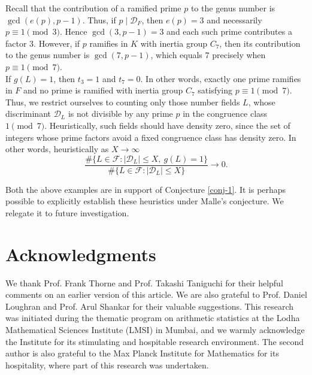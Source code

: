 \documentclass[11pt,reqno]{amsart}
\newcommand{\cD}{\mathcal{D}}
\theoremstyle{definition}
\theoremstyle{remark}
\begin{document}
Recall that the contribution of a ramified prime $p$ to the genus number is $\gcd(e(p),p-1)$. Thus, if $p\mid \mathcal{D}_F$, then $e(p)=3$ and necessarily $p\equiv 1\pmod{3}$. Hence $\gcd(3,p-1)=3$ and each such prime contributes a factor $3$. However, if $p$ ramifies in $K$ with inertia group $C_7$, then its contribution to the genus number is $\gcd(7,p-1)$, which equals $7$ precisely when $p\equiv1\pmod7$.\\

If $g(L)=1$, then  $t_3=1$ and  $t_7=0$. In other words, exactly one prime ramifies in $F$ and no prime is ramified with inertia group $C_7$ satisfying $p\equiv 1 \pmod 7$. Thus, we restrict ourselves to counting only those number fields $L$, whose discriminant $\cD_L$ is not divisible by any prime $p$ in the congruence class $1\pmod 7$. Heuristically, such fields should have density zero, since the set of integers whose prime factors avoid a fixed congruence class has density zero. In other words, heuristically as $X\to\infty$
$$
    \frac{\#\{L\in\mathcal{F}:|\mathcal{D}_L|\le X,\ g(L)=1\}}
{\#\{L\in\mathcal{F}:|\mathcal{D}_L|\le X\}}
\longrightarrow 0.
$$

Both the above examples are in support of Conjecture \ref{conj-1}. It is perhaps possible to explicitly establish these heuristics under Malle's conjecture. We relegate it to future investigation.

 \section*{\bf Acknowledgments}
\medskip

We thank Prof. Frank Thorne and Prof. Takashi Taniguchi for their helpful comments on an earlier version of this article. We are also grateful to Prof. Daniel Loughran and Prof. Arul Shankar for their valuable suggestions. This research was initiated during the thematic program on arithmetic statistics at the Lodha Mathematical Sciences Institute (LMSI) in Mumbai, and we warmly acknowledge the Institute for its stimulating and hospitable research environment. The second author is also grateful to the Max Planck Institute for Mathematics for its hospitality, where part of this research was undertaken.
\end{document}
